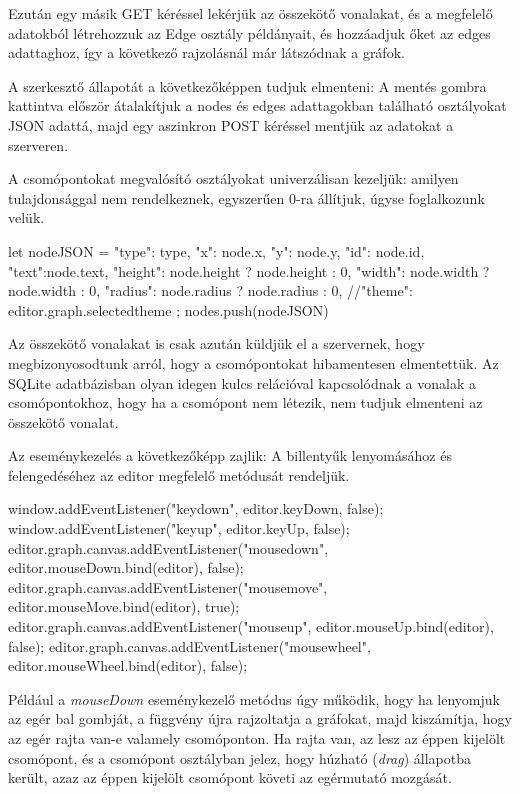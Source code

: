 Ezután egy másik GET kéréssel lekérjük az összekötő vonalakat, és a megfelelő adatokból létrehozzuk az Edge osztály példányait, és hozzáadjuk őket az edges adattaghoz, így a következő rajzolásnál már látszódnak a gráfok. 

A szerkesztő állapotát a következőképpen tudjuk elmenteni: A mentés gombra kattintva először átalakítjuk a nodes és edges adattagokban található osztályokat JSON adattá, majd egy aszinkron POST kéréssel mentjük az adatokat a szerveren.

A csomópontokat megvalósító osztályokat univerzálisan kezeljük: amilyen tulajdonsággal nem rendelkeznek, egyszerűen 0-ra állítjuk, úgyse foglalkozunk velük.

\begin{javascript}
       let nodeJSON = {
           "type": type,
           "x": node.x,
           "y": node.y,
           "id": node.id,
           "text":node.text,
           "height": node.height ? node.height : 0,
           "width": node.width ? node.width : 0,
           "radius": node.radius ? node.radius : 0,
           //"theme": editor.graph.selectedtheme
       };
       nodes.push(nodeJSON)
\end{javascript}

Az összekötő vonalakat is csak azután küldjük el a szervernek, hogy megbizonyosodtunk arról, hogy a csomópontokat hibamentesen elmentettük. Az SQLite adatbázisban olyan idegen kulcs relációval kapcsolódnak a vonalak a csomópontokhoz, hogy ha a csomópont nem létezik, nem tudjuk elmenteni az összekötő vonalat.
 
Az eseménykezelés a következőképp zajlik: A billentyűk lenyomásához és felengedéséhez az editor megfelelő metódusát rendeljük.

\begin{javascript}
window.addEventListener("keydown", editor.keyDown, false);
window.addEventListener("keyup", editor.keyUp, false);
editor.graph.canvas.addEventListener("mousedown", editor.mouseDown.bind(editor), false);
editor.graph.canvas.addEventListener("mousemove", editor.mouseMove.bind(editor), true);
editor.graph.canvas.addEventListener("mouseup", editor.mouseUp.bind(editor), false);
editor.graph.canvas.addEventListener("mousewheel", editor.mouseWheel.bind(editor), false);
\end{javascript}
 
Például a \textit{mouseDown} eseménykezelő metódus úgy működik, hogy ha lenyomjuk az egér bal gombját, a függvény újra rajzoltatja a gráfokat, majd kiszámítja, hogy az egér rajta van-e valamely csomóponton. Ha rajta van, az lesz az éppen kijelölt csomópont, és a csomópont osztályban jelez, hogy húzható (\textit{drag}) állapotba került, azaz az éppen kijelölt csomópont követi az egérmutató mozgását.


